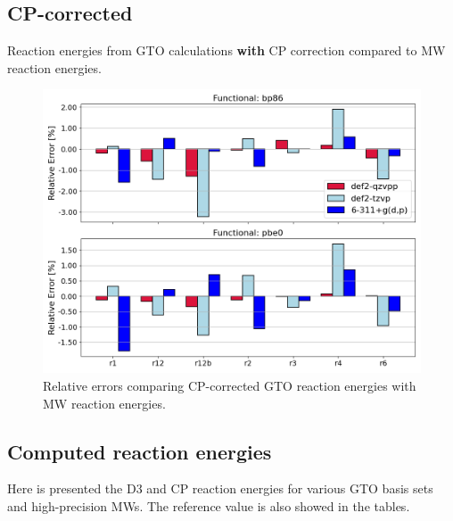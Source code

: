 \documentclass[11pt,a4paper]{article}
\begin{document}
	\subsection{CP-corrected}
	Reaction energies from GTO calculations \textbf{with} CP correction compared to MW reaction energies.
	\begin{figure}[H]
		\centering
		\includegraphics[width = \textwidth]{../figs/old_gto_vs_mw_cp.png}
		\caption{Relative errors comparing CP-corrected GTO reaction energies with MW reaction energies.}
		\label{fig: }
	\end{figure}

	\subsection{Computed reaction energies}
	Here is presented the D3 and CP reaction energies for various GTO basis sets and high-precision MWs. The reference value\parencite{dohm2018} is also showed in the tables.
	
\end{document}
